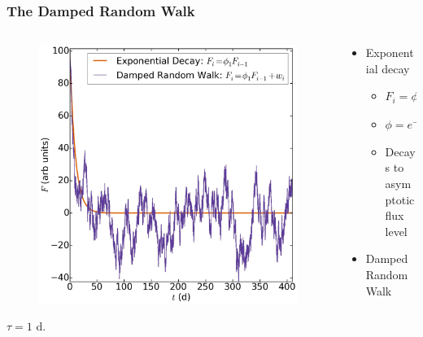 \documentclass[hyperref={pdfpagelabels=false}]{beamer}
\begin{document}
\begin{frame}
\frametitle{The Damped Random Walk}
  \begin{columns}
    \centering
    \begin{column}{0.5\textwidth}
      \begin{figure}
        \includegraphics[scale=0.12]{images/DRW_Illustration.jpg}
      \end{figure}
      \centering
      {\tiny $\tau = 1$ d.}
    \end{column}
    \begin{column}{0.5\textwidth}
    \begin{itemize}
    \item Exponential decay
      \begin{itemize}
        \item $F_{i} = \phi_{1} F_{i-1}$
        \item $\phi = e^{-\frac{\delta t}{\tau}} < 1$
        \item Decays to asymptotic flux level %
      \end{itemize}
    \item Damped Random Walk
      \begin{itemize}

\end{itemize}
\end{itemize}
\end{column}
\end{columns}
\end{frame}
\end{document}
